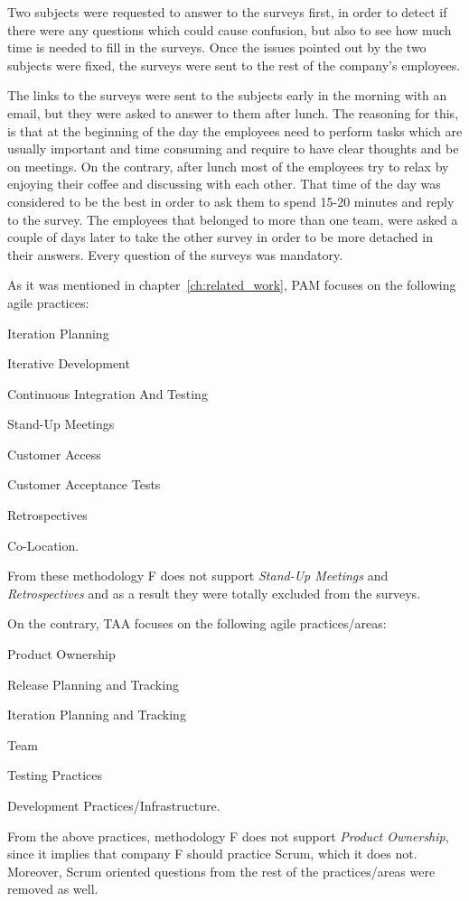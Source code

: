 Two subjects were requested to answer to the surveys first, in order to detect if there were any questions which could cause confusion, but also to see how much time is needed to fill in the surveys. Once the issues pointed out by the two subjects were fixed, the surveys were sent to the rest of the company's employees.

The links to the surveys were sent to the subjects early in the morning with an email, but they were asked to answer to them after lunch. The reasoning for this, is that at the beginning of the day the employees need to perform tasks which are usually important and time consuming and require to have clear thoughts and be on meetings. On the contrary, after lunch most of the employees try to relax by enjoying their coffee and discussing with each other. That time of the day was considered to be the best in order to ask them to spend 15-20 minutes and reply to the survey. The employees that belonged to more than one team, were asked a couple of days later to take the other survey in order to be more detached in their answers. Every question of the surveys was mandatory.

As it was mentioned in chapter~\ref{ch:related_work}, PAM focuses on the following agile practices:
\begin{inparaenum} [a\upshape)]
	\item Iteration Planning
	\item Iterative Development
	\item Continuous Integration And Testing
	\item Stand-Up Meetings
	\item Customer Access
	\item Customer Acceptance Tests
	\item Retrospectives
	\item Co-Location.
\end{inparaenum}
From these methodology F does not support \textit{Stand-Up Meetings} and \textit{Retrospectives} and as a result they were totally excluded from the surveys.

On the contrary, TAA focuses on the following agile practices/areas:
\begin{inparaenum} [a\upshape)]
	\item Product Ownership
	\item Release Planning and Tracking
	\item Iteration Planning and Tracking
	\item Team
	\item Testing Practices
	\item Development Practices/Infrastructure.
\end{inparaenum}
From the above practices, methodology F does not support \textit{Product Ownership}, since it implies that company F should practice Scrum, which it does not. Moreover, Scrum oriented questions from the rest of the practices/areas were removed as well. 

